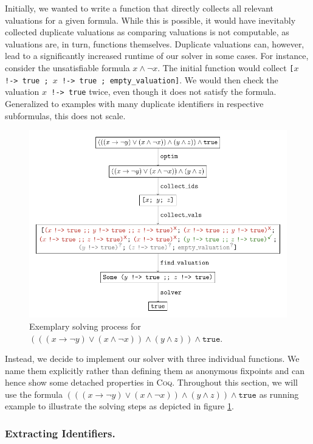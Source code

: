 Initially, we wanted to write a function that directly collects all relevant valuations for a given formula.
While this is possible, it would have inevitably collected duplicate valuations as comparing valuations is not computable, as valuations are, in turn, functions themselves.
Duplicate valuations can, however, lead to a significantly increased runtime of our solver in some cases.
For instance, consider the unsatisfiable formula $x \land \neg x$.
The initial function would collect \texttt{[$x$ !-> true ; $x$ !-> true ; empty\_valuation]}.
We would then check the valuation \texttt{$x$ !-> true} twice, even though it does not satisfy the formula.
Generalized to examples with many duplicate identifiers in respective subformulas, this does not scale.

\begin{figure}[t]
    \centering
    \includegraphics[scale=0.9]{figures/solver.pdf}
    \caption{Exemplary solving process for $(((x \rightarrow \neg y) \lor (x \land \neg x)) \land (y \land z)) \land \texttt{true}$.}
    \label{fig:solver}
\end{figure}

Instead, we decide to implement our solver with three individual functions.
We name them explicitly rather than defining them as anonymous fixpoints and can hence show some detached properties in \textsc{Coq}.
Throughout this section, we will use the formula $(((x \rightarrow \neg y) \lor (x \land \neg x)) \land (y \land z)) \land \texttt{true}$ as running example to illustrate the solving steps as depicted in figure \ref{fig:solver}.

\subsubsection{Extracting Identifiers.}


